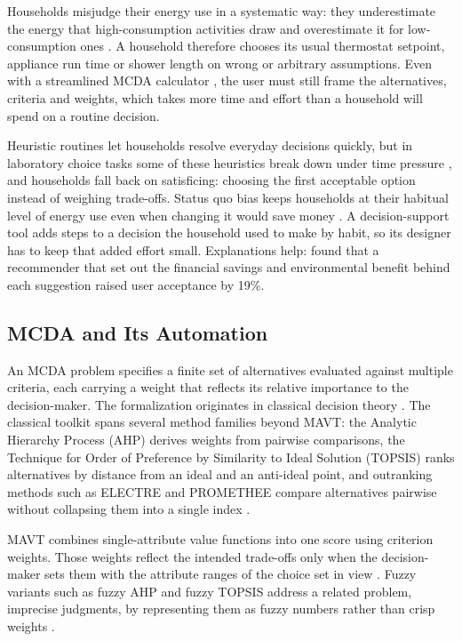 \documentclass[final,3p,times]{elsarticle}
\begin{document}
Households misjudge their energy use in a systematic way: they underestimate the energy that high-consumption activities draw and overestimate it for low-consumption ones \cite{attari2010}. A household therefore chooses its usual thermostat setpoint, appliance run time or shower length on wrong or arbitrary assumptions. Even with a streamlined MCDA calculator \cite{huangburgherr2024}, the user must still frame the alternatives, criteria and weights, which takes more time and effort than a household will spend on a routine decision.

Heuristic routines let households resolve everyday decisions quickly, but in laboratory choice tasks some of these heuristics break down under time pressure \cite{bobadilla2018}, and households fall back on satisficing: choosing the first acceptable option instead of weighing trade-offs. Status quo bias keeps households at their habitual level of energy use even when changing it would save money \cite{gill2022}. A decision-support tool adds steps to a decision the household used to make by habit, so its designer has to keep that added effort small. Explanations help: \citet{sardianos2021} found that a recommender that set out the financial savings and environmental benefit behind each suggestion raised user acceptance by 19\%.

\subsection{MCDA and Its Automation}
\label{sec:lit-mcda}

An MCDA problem specifies a finite set of alternatives evaluated against multiple criteria, each carrying a weight that reflects its relative importance to the decision-maker. The formalization originates in classical decision theory \cite{keeneyraiffa1976,dyer1979}. The classical toolkit spans several method families beyond MAVT: the Analytic Hierarchy Process (AHP) derives weights from pairwise comparisons, the Technique for Order of Preference by Similarity to Ideal Solution (TOPSIS) ranks alternatives by distance from an ideal and an anti-ideal point, and outranking methods such as ELECTRE and PROMETHEE compare alternatives pairwise without collapsing them into a single index \cite{huang2011}.

MAVT combines single-attribute value functions into one score using criterion weights. Those weights reflect the intended trade-offs only when the decision-maker sets them with the attribute ranges of the choice set in view \cite{vonnitzsch1993}. Fuzzy variants such as fuzzy AHP and fuzzy TOPSIS address a related problem, imprecise judgments, by representing them as fuzzy numbers rather than crisp weights \cite{zadeh1965}.
\end{document}
